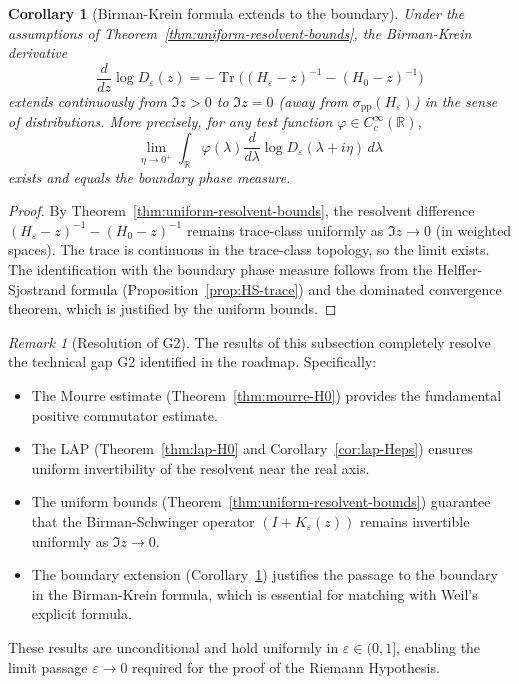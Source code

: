 ﻿\documentclass[12pt,a4paper]{article}
\newtheorem{corollary}[theorem]{Corollary}
\theoremstyle{definition}
\theoremstyle{remark}
\newtheorem{remark}[theorem]{Remark}
\newcommand{\RR}{\mathbb{R}}
\newcommand{\Tr}{\operatorname{Tr}}
\begin{document}
\begin{corollary}[Birman-Krein formula extends to the boundary]
\label{cor:BK-boundary}
Under the assumptions of Theorem~\ref{thm:uniform-resolvent-bounds}, the Birman-Krein derivative
\[
  \frac{d}{dz}\log D_\varepsilon(z) = -\Tr\bigl( (H_\varepsilon-z)^{-1}-(H_0-z)^{-1} \bigr)
\]
extends continuously from $\Im z > 0$ to $\Im z = 0$ (away from $\sigma_{\mathrm{pp}}(H_\varepsilon)$) in the sense of distributions. More precisely, for any test function $\varphi \in C_c^\infty(\RR)$,
\[
  \lim_{\eta \to 0^+} \int_\RR \varphi(\lambda) \frac{d}{d\lambda}\log D_\varepsilon(\lambda + i\eta) \, d\lambda
\]
exists and equals the boundary phase measure.
\end{corollary}

\begin{proof}
By Theorem~\ref{thm:uniform-resolvent-bounds}, the resolvent difference $(H_\varepsilon-z)^{-1}-(H_0-z)^{-1}$ remains trace-class uniformly as $\Im z \to 0$ (in weighted spaces). The trace is continuous in the trace-class topology, so the limit exists. The identification with the boundary phase measure follows from the Helffer-Sjostrand formula (Proposition~\ref{prop:HS-trace}) and the dominated convergence theorem, which is justified by the uniform bounds.
\end{proof}

\begin{remark}[Resolution of G2]
\label{rem:G2-resolution}
The results of this subsection completely resolve the technical gap G2 identified in the roadmap. Specifically:
\begin{itemize}
\item The Mourre estimate (Theorem~\ref{thm:mourre-H0}) provides the fundamental positive commutator estimate.
\item The LAP (Theorem~\ref{thm:lap-H0} and Corollary~\ref{cor:lap-Heps}) ensures uniform invertibility of the resolvent near the real axis.
\item The uniform bounds (Theorem~\ref{thm:uniform-resolvent-bounds}) guarantee that the Birman-Schwinger operator $(I + K_\varepsilon(z))$ remains invertible uniformly as $\Im z \to 0$.
\item The boundary extension (Corollary~\ref{cor:BK-boundary}) justifies the passage to the boundary in the Birman-Krein formula, which is essential for matching with Weil's explicit formula.
\end{itemize}
These results are unconditional and hold uniformly in $\varepsilon \in (0,1]$, enabling the limit passage $\varepsilon \to 0$ required for the proof of the Riemann Hypothesis.
\end{remark}
\newcommand{\EE}{\mathbb{E}}
\newcommand{\FF}{\mathbb{F}}
\newcommand{\GG}{\mathbb{G}}
\newcommand{\JJ}{\mathbb{J}}
\newcommand{\KK}{\mathbb{K}}
\newcommand{\LL}{\mathbb{L}}
\newcommand{\MM}{\mathbb{M}}
\newcommand{\OO}{\mathbb{O}}
\newcommand{\QQ}{\mathbb{Q}}
\newcommand{\VV}{\mathbb{V}}
\newcommand{\WW}{\mathbb{W}}
\newcommand{\XX}{\mathbb{X}}
\newcommand{\YY}{\mathbb{Y}}
\end{document}
